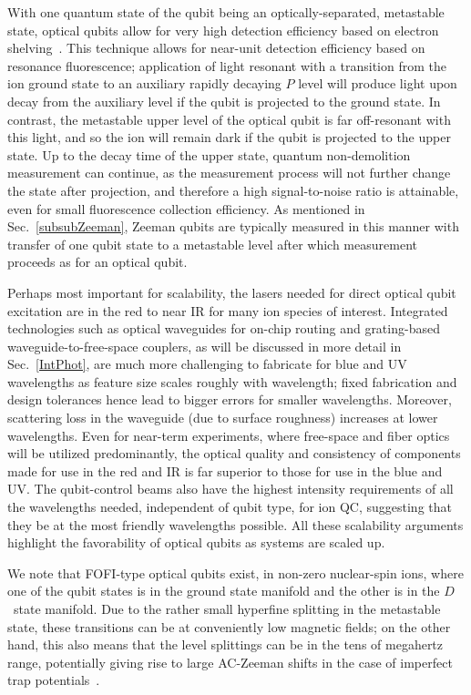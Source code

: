 \documentclass[%
reprint,
 amsmath,amssymb,
]{revtex4-1}
\begin{document}
With one quantum state of the qubit being an optically-separated, metastable state, optical qubits allow for very high detection efficiency based on electron shelving~\cite{dehmelt_shelving}.  This technique allows for near-unit detection efficiency based on resonance fluorescence; application of light resonant with a transition from the ion ground state to an auxiliary rapidly decaying $P$ level will produce light upon decay from the auxiliary level if the qubit is projected to the ground state.  In contrast, the metastable upper level of the optical qubit is far off-resonant with this light, and so the ion will remain dark if the qubit is projected to the upper state.  Up to the decay time of the upper state, quantum non-demolition measurement can continue, as the measurement process will not further change the state after projection, and therefore a high signal-to-noise ratio is attainable, even for small fluorescence collection efficiency.  As mentioned in Sec.~\ref{subsubZeeman}, Zeeman qubits are typically measured in this manner with transfer of one qubit state to a metastable level after which measurement proceeds as for an optical qubit.

Perhaps most important for scalability, the lasers needed for direct optical qubit excitation are in the red to near IR for many ion species of interest.  Integrated technologies such as optical waveguides for on-chip routing and grating-based waveguide-to-free-space couplers, as will be discussed in more detail in Sec.~\ref{IntPhot}, are much more challenging to fabricate for blue and UV wavelengths as feature size scales roughly with wavelength; fixed fabrication and design tolerances hence lead to bigger errors for smaller wavelengths.  Moreover, scattering loss in the waveguide (due to surface roughness) increases at lower wavelengths.  Even for near-term experiments, where free-space and fiber optics will be utilized predominantly, the optical quality and consistency of components made for use in the red and IR is far superior to those for use in the blue and UV.  The qubit-control beams also have the highest intensity requirements of all the wavelengths needed, independent of qubit type, for ion QC, suggesting that they be at the most friendly wavelengths possible.  All these scalability arguments highlight the favorability of optical qubits as systems are scaled up.

We note that FOFI-type optical qubits exist, in non-zero nuclear-spin ions, where one of the qubit states is in the ground state manifold and the other is in the $D$~state manifold.  Due to the rather small hyperfine splitting in the metastable state, these transitions can be at conveniently low magnetic fields; on the other hand, this also means that the level splittings can be in the tens of megahertz range, potentially giving rise to large AC-Zeeman shifts in the case of imperfect trap potentials~\cite{PhysRevA.75.032506}.
\end{document}
